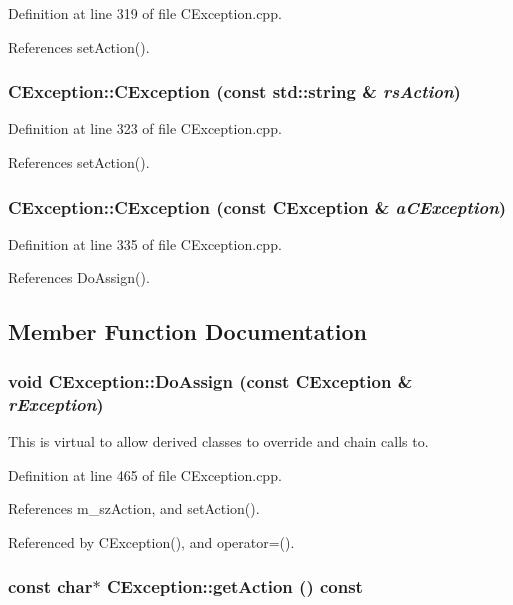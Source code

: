 Definition at line 319 of file CException.cpp.

References set\-Action().
\subsubsection{\setlength{\rightskip}{0pt plus 5cm}CException::CException (const std::string \& {\em rs\-Action})}\label{classCException_a2}




Definition at line 323 of file CException.cpp.

References set\-Action().
\subsubsection{\setlength{\rightskip}{0pt plus 5cm}CException::CException (const CException \& {\em a\-CException})}\label{classCException_a3}




Definition at line 335 of file CException.cpp.

References Do\-Assign().

\subsection{Member Function Documentation}
\subsubsection{\setlength{\rightskip}{0pt plus 5cm}void CException::Do\-Assign (const CException \& {\em r\-Exception})\hspace{0.3cm}{\tt  [protected, virtual]}}\label{classCException_b2}


This is virtual to allow derived classes to override and chain calls to. 

Definition at line 465 of file CException.cpp.

References m\_\-sz\-Action, and set\-Action().

Referenced by CException(), and operator=().
\subsubsection{\setlength{\rightskip}{0pt plus 5cm}const char$\ast$ CException::get\-Action () const\hspace{0.3cm}{\tt  [inline]}}\label{classCException_a7}




